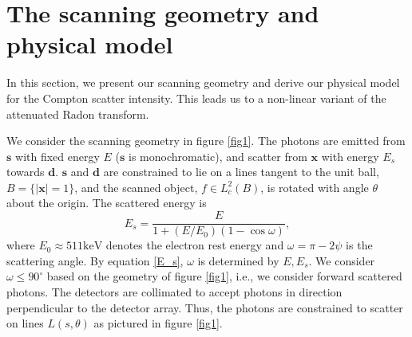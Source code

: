 \documentclass[a4paper,12pt]{amsart}
\numberwithin{equation}{section}
\theoremstyle{plain}
\numberwithin{theorem}{section}
\theoremstyle{definition}
\theoremstyle{remark}
\theoremstyle{remark}
\theoremstyle{remark}
\newcommand{\vx}{{\mathbf{x}}}
\newcommand{\vs}{\mathbf{s}}
\newcommand{\vd}{\mathbf{d}}
\begin{document}
\section{The scanning geometry and physical model} 
\label{model}
In this section, we present our scanning geometry and derive our physical model for the Compton scatter intensity. This leads us to a non-linear variant of the attenuated Radon transform.

We consider the scanning geometry in figure \ref{fig1}. The photons are emitted from $\vs$ with fixed energy $E$ ($\vs$ is monochromatic), and scatter from $\vx$ with energy $E_s$ towards $\vd$. $\vs$ and $\vd$ are constrained to lie on a lines tangent to the unit ball, $B = \{|\vx| = 1\}$, and the scanned object, $f \in L^2_c(B)$, is rotated with angle $\theta$ about the origin. The scattered energy is
\begin{equation}
\label{E_s}
E_s=\frac{E}{1+(E/E_0)(1-\cos\omega)},
\end{equation}
where $E_0\approx 511\text{keV}$ denotes the electron rest energy and $\omega = \pi - 2\psi$ is the scattering angle. By equation \eqref{E_s}, $\omega$ is determined by $E, E_s$. We consider $\omega \leq 90^\circ$ based on the geometry of figure \ref{fig1}, i.e., we consider forward scattered photons. The detectors are collimated to accept photons in direction perpendicular to the detector array. Thus, the photons are constrained to scatter on lines $L(s,\theta)$ as pictured in figure \ref{fig1}.
\end{document}
